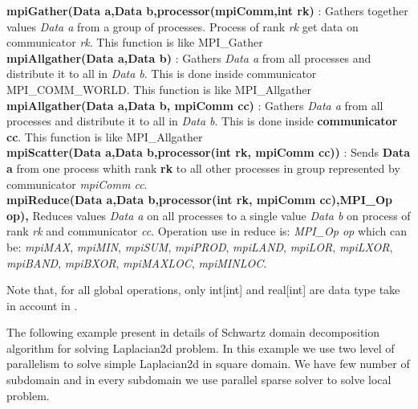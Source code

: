 \documentclass[a4paper,twoside,12pt]{book}
\begin{document}
\textbf{mpiGather(Data a,Data b,processor(mpiComm,int rk)} : Gathers together
values  \textit{Data a}  from a group of processes. Process of rank \textit{rk}
get data on communicator \textit{rk}.  This function is like MPI\_Gather\\


\textbf{mpiAllgather(Data a,Data b)} : Gathers \textit{Data a} from all
processes and distribute it to all in \textit{Data b}. This is done inside
communicator MPI\_COMM\_WORLD. This function is like MPI\_Allgather\\

\textbf{mpiAllgather(Data a,Data b, mpiComm cc)} : Gathers \textit{Data a} from
all processes and distribute it to all in \textit{Data b}. This is done inside
\textbf{communicator cc}. This function is like MPI\_Allgather\\



\textbf{mpiScatter(Data a,Data b,processor(int rk, mpiComm cc))} : Sends
\textbf{Data a} from one process whith rank \textbf{rk} to all other processes
in group represented by communicator  \textit{mpiComm cc}.\\

\textbf{mpiReduce(Data a,Data b,processor(int rk, mpiComm cc),MPI\_Op op), }
Reduces values \textit{Data a} on all processes
to a single value \textit{Data b} on process of rank \textit{rk} and
communicator \textit{cc}.
Operation use in reduce is: \textit{MPI\_Op op} which can be: \textit{mpiMAX},
\textit{mpiMIN}, \textit{mpiSUM},
 \textit{mpiPROD}, \textit{mpiLAND}, \textit{mpiLOR}, \textit{mpiLXOR},
\textit{mpiBAND},
 \textit{mpiBXOR}, \textit{mpiMAXLOC}, \textit{mpiMINLOC}.

Note that, for all global operations, only int[int] and real[int] are data type
take in account in \freefempp.

The following example present in details of Schwartz domain decomposition
algorithm for solving Laplacian2d problem. In this example we use two level
of parallelism to solve simple Laplacian2d in square domain. We have few number
of subdomain and in every subdomain we use parallel sparse solver to solve local problem.
\end{document}
